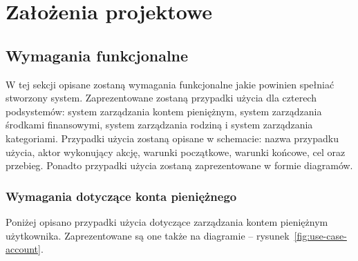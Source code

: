 \chapter{Założenia projektowe}
\label{chap:zalozenia-projektowe}
\section{Wymagania funkcjonalne}
\label{sec:wymagania-funkcjonalne}

W tej sekcji opisane zostaną wymagania funkcjonalne jakie powinien spełniać stworzony system. Zaprezentowane zostaną przypadki użycia dla czterech podsystemów: system zarządzania kontem pieniężnym, system zarządzania środkami finansowymi, system zarządzania rodziną i system zarządzania kategoriami. Przypadki użycia zostaną opisane w schemacie: nazwa przypadku użycia, aktor wykonujący akcję, warunki początkowe, warunki końcowe, cel oraz przebieg. Ponadto przypadki użycia zostaną zaprezentowane w formie diagramów.

\subsection{Wymagania dotyczące konta pieniężnego}
\label{subsec:wymagania-konto}
Poniżej opisano przypadki użycia dotyczące zarządzania kontem pieniężnym użytkownika. Zaprezentowane są one także na diagramie -- rysunek~\ref{fig:use-case-account}.

